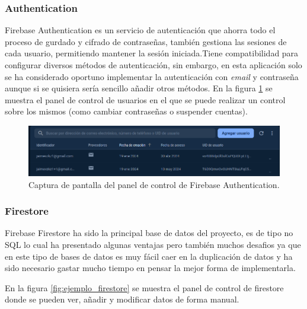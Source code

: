 \subsubsection{Authentication}
Firebase Authentication\hyperlink{cap:biblio}{} es un servicio de autenticación que ahorra todo el proceso de gurdado y cifrado de contraseñas, también gestiona las sesiones de cada usuario, permitiendo mantener la sesión iniciada.Tiene compatibilidad para configurar diversos métodos de autenticación, sin embargo, en esta aplicación solo se ha considerado oportuno implementar la autenticación con \textit{email} y contraseña aunque si se quisiera sería sencillo añadir otros métodos. En la figura \ref{fig:ejemplo_auth} se muestra el panel de control de usuarios en el que se puede realizar un control sobre los mismos (como cambiar contraseñas o suspender cuentas).
\begin{figure}[h]
    \centering
    \includegraphics[width = 1\textwidth]{Imagenes/Fuentes/ejemplo_auth.png}
    \caption{Captura de pantalla del panel de control de Firebase Authentication.}
    \label{fig:ejemplo_auth}
\end{figure}
\hypertarget{subsec:firestore}{}
\subsubsection{Firestore} 
Firebase Firestore \hyperlink{cap:biblio}{} ha sido la principal base de datos del proyecto, es de tipo no SQL lo cual ha presentado algunas ventajas pero también muchos desafios ya que en este tipo de bases de datos es muy fácil caer en la duplicación de datos y ha sido necesario gastar mucho tiempo en pensar la mejor forma de implementarla. 

En la figura \ref{fig:ejemplo_firestore} se muestra el panel de control de firestore donde se pueden ver, añadir y modificar datos de forma manual. 

